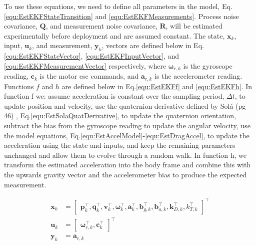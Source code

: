 \documentclass{report_template_oxford}
\begin{document}
To use these equations, we need to define all parameters in the model, Eq. \ref{equ:EstEKFStateTransition} and \ref{equ:EstEKFMeasurements}. Process noise covariance, $\mathbf{Q}$, and measurement noise covariance, $\mathbf{R}$, will be estimated experimentally before deployment and are assumed constant. The state, $\mathbf{x}_k$, input, $\mathbf{u}_k$, and measurement, $\mathbf{y}_k$, vectors are defined below in Eq.\ref{equ:EstEKFStateVector}, \ref{equ:EstEKFInputVector}, and \ref{equ:EstEKFMeasurementVector} respectively, where $\boldsymbol{\omega}_{r,k}$ is the gyroscope reading, $\mathbf{c}_k$ is the motor \gls{esc} commands, and $\mathbf{a}_{r,k}$ is the accelerometer reading. Functions $f$ and $h$ are defined below in Eq.\ref{equ:EstEKFf} and \ref{equ:EstEKFh}. In function f we: assume acceleration is constant over the sampling period, $\Delta t$, to update position and velocity, use the quaternion derivative defined by Sol\'{a} (pg 46)  \cite{quaternionDerivative}, Eq.\ref{equ:EstSolaQuatDerivative}, to update the quaternion orientation, subtract the bias from the gyroscope reading to update the angular velocity, use the model equations, Eq.\ref{equ:EstAccelModel}-\ref{equ:EstDragAccel}, to update the acceleration using the state and inputs, and keep the remaining parameters unchanged and allow them to evolve through a random walk. In function h, we transform the estimated acceleration into the body frame and combine this with the upwards gravity vector and the accelerometer bias to produce the expected measurement.

\begin{align} 
    \mathbf{x}_k & = \begin{bmatrix}\mathbf{p}_k^\top, \mathbf{q}_k^\top, \mathbf{v}_k^\top, \boldsymbol{\omega}_k^\top, \mathbf{a}_k^\top, \mathbf{b}_{g,k}^\top, \mathbf{b}_{a,k}^\top, \mathbf{k}_{D,k}^\top, k_{T,k}^\top\end{bmatrix}^\top \label{equ:EstEKFStateVector} \\
    \mathbf{u}_k & = \begin{bmatrix} \boldsymbol{\omega}_{r,k}^\top, \mathbf{c}_k^\top\end{bmatrix}^\top \label{equ:EstEKFInputVector} \\
    \mathbf{y}_k & = \mathbf{a}_{r,k} \label{equ:EstEKFMeasurementVector}
\end{align}
\end{document}
